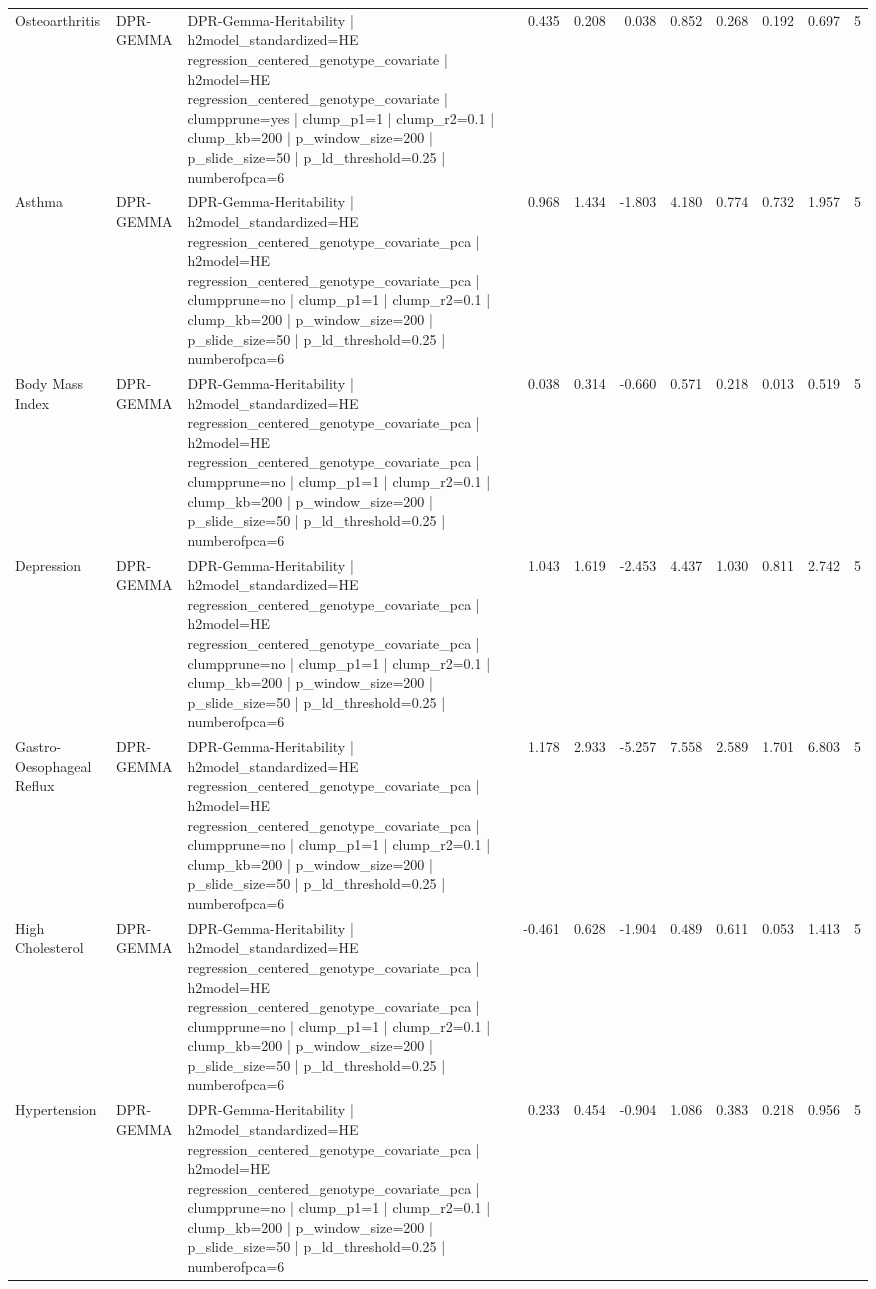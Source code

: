 \begin{landscape}
\begin{longtable}{p{2.4cm}p{1.8cm}p{6.0cm}rrrrrrrr}
Osteoarthritis & DPR-GEMMA & DPR-Gemma-Heritability | h2model\_standardized=HE regression\_centered\_genotype\_covariate | h2model=HE regression\_centered\_genotype\_covariate | clumpprune=yes | clump\_p1=1 | clump\_r2=0.1 | clump\_kb=200 | p\_window\_size=200 | p\_slide\_size=50 | p\_ld\_threshold=0.25 | numberofpca=6 & 0.435 & 0.208 & 0.038 & 0.852 & 0.268 & 0.192 & 0.697 & 5 \\
Asthma & DPR-GEMMA & DPR-Gemma-Heritability | h2model\_standardized=HE regression\_centered\_genotype\_covariate\_pca | h2model=HE regression\_centered\_genotype\_covariate\_pca | clumpprune=no | clump\_p1=1 | clump\_r2=0.1 | clump\_kb=200 | p\_window\_size=200 | p\_slide\_size=50 | p\_ld\_threshold=0.25 | numberofpca=6 & 0.968 & 1.434 & -1.803 & 4.180 & 0.774 & 0.732 & 1.957 & 5 \\
Body Mass Index & DPR-GEMMA & DPR-Gemma-Heritability | h2model\_standardized=HE regression\_centered\_genotype\_covariate\_pca | h2model=HE regression\_centered\_genotype\_covariate\_pca | clumpprune=no | clump\_p1=1 | clump\_r2=0.1 | clump\_kb=200 | p\_window\_size=200 | p\_slide\_size=50 | p\_ld\_threshold=0.25 | numberofpca=6 & 0.038 & 0.314 & -0.660 & 0.571 & 0.218 & 0.013 & 0.519 & 5 \\
Depression & DPR-GEMMA & DPR-Gemma-Heritability | h2model\_standardized=HE regression\_centered\_genotype\_covariate\_pca | h2model=HE regression\_centered\_genotype\_covariate\_pca | clumpprune=no | clump\_p1=1 | clump\_r2=0.1 | clump\_kb=200 | p\_window\_size=200 | p\_slide\_size=50 | p\_ld\_threshold=0.25 | numberofpca=6 & 1.043 & 1.619 & -2.453 & 4.437 & 1.030 & 0.811 & 2.742 & 5 \\
Gastro-Oesophageal Reflux & DPR-GEMMA & DPR-Gemma-Heritability | h2model\_standardized=HE regression\_centered\_genotype\_covariate\_pca | h2model=HE regression\_centered\_genotype\_covariate\_pca | clumpprune=no | clump\_p1=1 | clump\_r2=0.1 | clump\_kb=200 | p\_window\_size=200 | p\_slide\_size=50 | p\_ld\_threshold=0.25 | numberofpca=6 & 1.178 & 2.933 & -5.257 & 7.558 & 2.589 & 1.701 & 6.803 & 5 \\
High Cholesterol & DPR-GEMMA & DPR-Gemma-Heritability | h2model\_standardized=HE regression\_centered\_genotype\_covariate\_pca | h2model=HE regression\_centered\_genotype\_covariate\_pca | clumpprune=no | clump\_p1=1 | clump\_r2=0.1 | clump\_kb=200 | p\_window\_size=200 | p\_slide\_size=50 | p\_ld\_threshold=0.25 | numberofpca=6 & -0.461 & 0.628 & -1.904 & 0.489 & 0.611 & 0.053 & 1.413 & 5 \\
Hypertension & DPR-GEMMA & DPR-Gemma-Heritability | h2model\_standardized=HE regression\_centered\_genotype\_covariate\_pca | h2model=HE regression\_centered\_genotype\_covariate\_pca | clumpprune=no | clump\_p1=1 | clump\_r2=0.1 | clump\_kb=200 | p\_window\_size=200 | p\_slide\_size=50 | p\_ld\_threshold=0.25 | numberofpca=6 & 0.233 & 0.454 & -0.904 & 1.086 & 0.383 & 0.218 & 0.956 & 5 \\

\end{longtable}
\end{landscape}
